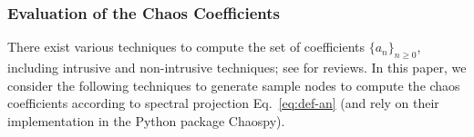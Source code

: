 \documentclass[preprint,review,12pt]{elsarticle}
\begin{document}
\subsubsection{Evaluation of the Chaos Coefficients}
\label{subsubsec:spectral projection}
There exist various techniques to compute the set of coefficients $\{a_n\}_{n \geq 0}$, including intrusive and non-intrusive techniques; see \citep{le2010spectral,ghanem2017handbook} for reviews. 
In this paper, we consider the following techniques to generate sample nodes to compute the chaos coefficients according to spectral projection Eq.~\eqref{eq:def-an} (and rely on their implementation in the Python package Chaospy).
\end{document}

